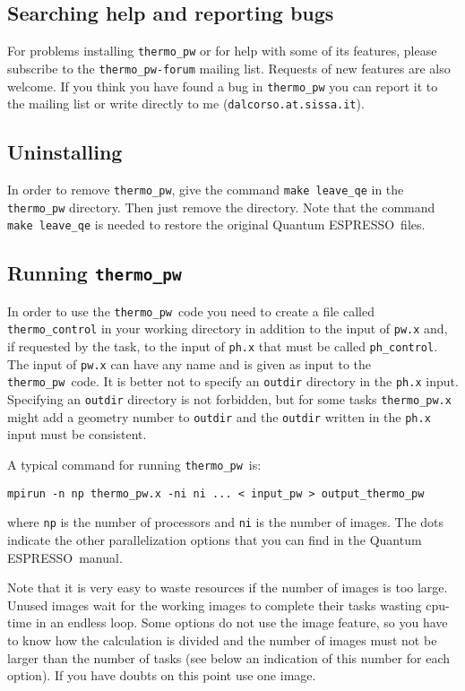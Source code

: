 \documentclass[12pt,a4paper]{article}
\def\qe{{\sc Quantum ESPRESSO}}
\def\thermo{\texttt{thermo\_pw}}
\begin{document}
\subsection{\color{web-blue}Searching help and reporting bugs}
For problems installing \texttt{thermo\_pw} or for help
with some of its features, please subscribe to the \texttt{thermo\_pw-forum}
mailing list. Requests of new features are also welcome. If you think you have
found a bug 
in \texttt{thermo\_pw} you can report it to the mailing list or 
write directly to me (\texttt{dalcorso.at.sissa.it}).

\subsection{\color{web-blue}Uninstalling}

In order to remove \thermo, give the command \texttt{make leave\_qe} in the
\texttt{thermo\_pw} directory. Then just remove the directory. Note that 
the command \texttt{make leave\_qe} is needed to restore the original \qe\ files.

\subsection{\color{web-blue}Running \thermo}

In order to use the \thermo\ code you need to create a file called
\texttt{thermo\_control} in your working directory in addition to 
the input of \texttt{pw.x} and, if requested by the task, to the
input of \texttt{ph.x} that must be called \texttt{ph\_control}.
The input of \texttt{pw.x} can have any name and is given as input to
the \thermo\ code. It is better not to specify an \texttt{outdir} 
directory in the \texttt{ph.x} input. Specifying an \texttt{outdir}
directory is not forbidden, but for some tasks \texttt{thermo\_pw.x} 
might add a geometry number to \texttt{outdir} and the
\texttt{outdir} written in the \texttt{ph.x} input must be consistent.

A typical command for running \thermo\ is:
\begin{verbatim}
mpirun -n np thermo_pw.x -ni ni ... < input_pw > output_thermo_pw
\end{verbatim}
where \texttt{np} is the number of processors and \texttt{ni} is the number 
of images. The dots indicate the other parallelization options that
you can find in the \qe\ manual.

Note that it is very easy to waste resources if the number of 
images is too large. Unused images wait for the working images to complete
their tasks wasting cpu-time in an endless loop. 
Some options 
do not use the image feature, so you have to know how the calculation 
is divided and the number of images must not
be larger than the number of tasks (see below an indication of this number
for each option). If you have doubts on this point use one image.
\end{document}
